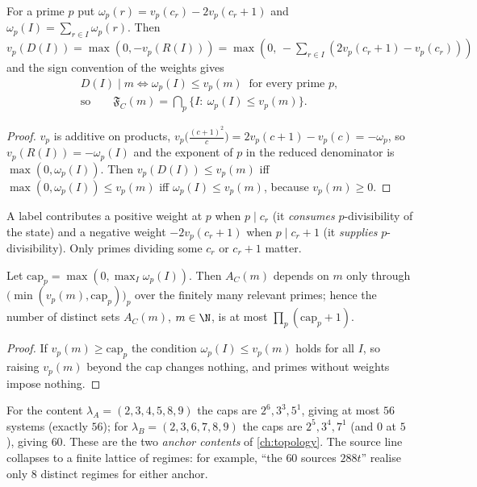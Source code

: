 \begin{proposition}\label{prop:valuation}
For a prime $p$ put $\omega_p(r)=v_p(c_r)-2v_p(c_r+1)$ and $\omega_p(I)=\sum_{r\in I}\omega_p(r)$. Then $v_p(D(I))=\max(0,-v_p(R(I)))=\max(0,\,-\!\sum_{r\in I}(2v_p(c_r{+}1)-v_p(c_r)))$ and the sign convention of the weights gives
\begin{gather*}
D(I)\mid m\iff \omega_p(I)\le v_p(m)\ \text{ for every prime }p,\\
\text{so}\qquad \mathfrak F_C(m)=\bigcap_p\{I:\ \omega_p(I)\le v_p(m)\}.\end{gather*}
\end{proposition}
\begin{proof}
$v_p$ is additive on products, $v_p\big(\frac{(c+1)^2}{c}\big)=2v_p(c{+}1)-v_p(c)=-\omega_p$, so $v_p(R(I))=-\omega_p(I)$ and the exponent of $p$ in the reduced denominator is $\max(0,\omega_p(I))$. Then $v_p(D(I))\le v_p(m)$ iff $\max(0,\omega_p(I))\le v_p(m)$ iff $\omega_p(I)\le v_p(m)$, because $v_p(m)\ge0$.
\end{proof}
A label contributes a positive weight at $p$ when $p\mid c_r$ (it \emph{consumes} $p$-divisibility of the state) and a negative weight $-2v_p(c_r{+}1)$ when $p\mid c_r+1$ (it \emph{supplies} $p$-divisibility). Only primes dividing some $c_r$ or $c_r+1$ matter.

\begin{corollary}\label{prop:finite-lattice}
Let $\mathrm{cap}_p=\max(0,\max_I\omega_p(I))$. Then $A_C(m)$ depends on $m$ only through $\big(\min(v_p(m),\mathrm{cap}_p)\big)_p$ over the finitely many relevant primes; hence the number of distinct sets $A_C(m)$, $m\in\N$, is at most $\prod_p(\mathrm{cap}_p+1)$.
\end{corollary}
\begin{proof}
If $v_p(m)\ge\mathrm{cap}_p$ the condition $\omega_p(I)\le v_p(m)$ holds for all $I$, so raising $v_p(m)$ beyond the cap changes nothing, and primes without weights impose nothing.
\end{proof}
For the content $\lambda_A=(2,3,4,5,8,9)$ the caps are $2^6,3^3,5^1$, giving at most $56$ systems (exactly $56$); for $\lambda_B=(2,3,6,7,8,9)$ the caps are $2^5,3^4,7^1$ (and $0$ at $5$), giving $60$. These are the two \emph{anchor contents} of \cref{ch:topology}. The source line collapses to a finite lattice of regimes: for example, ``the $60$ sources $288t$'' realise only $8$ distinct regimes for either anchor.

